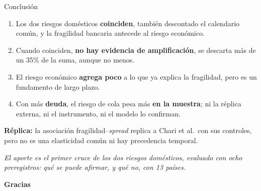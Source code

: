 \documentclass[aspectratio=169]{beamer}
\begin{document}
\begin{frame}{Conclusión}
\vspace{4pt}
\begin{enumerate}
\item Los dos riesgos domésticos \textbf{coinciden}, también descontado el calendario común, y la fragilidad bancaria antecede al riesgo económico.
\vspace{4pt}
\item Cuando coinciden, \textbf{no hay evidencia de amplificación}, se descarta más de un 35\% de la suma, aunque no menos.
\vspace{4pt}
\item El riesgo económico \textbf{agrega poco} a lo que ya explica la fragilidad, pero es un fundamento de largo plazo.
\vspace{4pt}
\item Con más \textbf{deuda}, el riesgo de cola pesa más \textbf{en la muestra}; ni la réplica externa, ni el instrumento, ni el modelo lo confirman.
\end{enumerate}
\vspace{4pt}
{\small \textbf{Réplica:} la asociación fragilidad--\textit{spread} replica a Chari et al.\ con sus controles, pero no es una elasticidad común ni hay precedencia temporal.\par}
\vspace{6pt}
\centering
\textit{El aporte es el primer cruce de los dos riesgos domésticos, evaluado con ocho preregistros: qué se puede afirmar, y qué no, con 13 países.}
\end{frame}

\begin{frame}
\vfill
\centering
{\Huge\bfseries\color{tesisblue} Gracias}
\vfill
\end{frame}

\appendix
\end{document}
